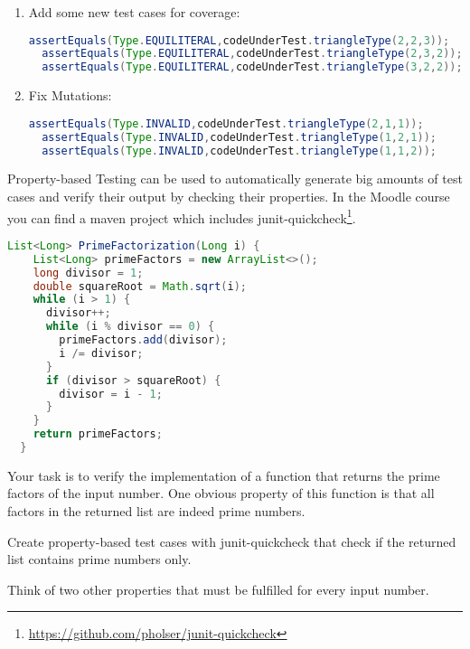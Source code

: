 \documentclass[language=en,sheet=2,prefix]{exercise}
\begin{document}
\begin{solution}
	
\begin{enumerate}
	\item Add some new test cases for coverage:
\begin{lstlisting}[language=Java,gobble=2]
  assertEquals(Type.EQUILITERAL,codeUnderTest.triangleType(2,2,3));
  assertEquals(Type.EQUILITERAL,codeUnderTest.triangleType(2,3,2));
  assertEquals(Type.EQUILITERAL,codeUnderTest.triangleType(3,2,2));
\end{lstlisting}
	
\item Fix Mutations:
\begin{lstlisting}[language=Java,gobble=2]
  assertEquals(Type.INVALID,codeUnderTest.triangleType(2,1,1));  
  assertEquals(Type.INVALID,codeUnderTest.triangleType(1,2,1));  
  assertEquals(Type.INVALID,codeUnderTest.triangleType(1,1,2)); 
\end{lstlisting}
\end{enumerate}

\end{solution}



Property-based Testing can be used to automatically generate big amounts of test cases and verify their output by checking their properties. In the Moodle course you can find a maven project which includes junit-quickcheck\footnote{\url{https://github.com/pholser/junit-quickcheck}}.\\

\begin{lstlisting}[language=Java,gobble=2]
  List<Long> PrimeFactorization(Long i) {
    List<Long> primeFactors = new ArrayList<>();
    long divisor = 1;
    double squareRoot = Math.sqrt(i);
    while (i > 1) {
      divisor++;
      while (i % divisor == 0) {
        primeFactors.add(divisor);
        i /= divisor;
      }
      if (divisor > squareRoot) {
        divisor = i - 1;
      }
    }
    return primeFactors;
  }
\end{lstlisting}

Your task is to verify the implementation of a function that returns the prime factors of the input number. One obvious property of this function is that all factors in the returned list are indeed prime numbers.
\begin{compactenum}
	\item Create property-based test cases with junit-quickcheck that check if the returned list contains prime numbers only.
	\item Think of two other properties that must be fulfilled for every input number.
\end{compactenum}
\end{document}

